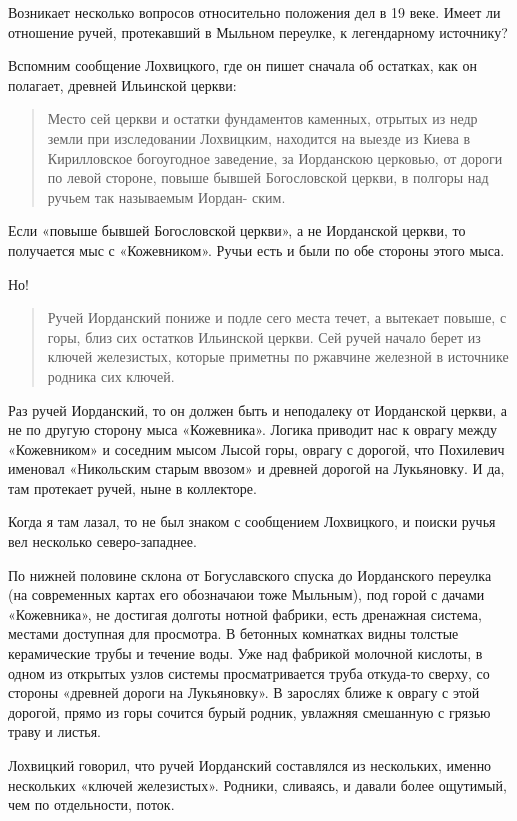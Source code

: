 Возникает несколько вопросов относительно положения дел в 19 веке. Имеет ли отношение ручей, протекавший в Мыльном переулке, к легендарному источнику?

Вспомним сообщение Лохвицкого, где он пишет сначала об остатках, как он полагает, древней Ильинской церкви: 

\begin{quotation}
Место сей церкви и остатки фундаментов
каменных, отрытых из недр земли при изследовании Лохвицким, находится на выезде из Киева в Кирилловское богоугодное заведение,
за Иорданскою церковью, от дороги по левой
стороне, повыше бывшей Богословской церкви,
в полгоры над ручьем так называемым Иордан-
ским.
\end{quotation}

Если «повыше бывшей Богословской церкви», а не Иорданской церкви, то получается мыс с «Кожевником». Ручьи есть и были по обе стороны этого мыса.

Но!

\begin{quotation}
Ручей Иорданский пониже и подле сего места течет, а вытекает повыше, с горы, близ сих остатков Ильинской церкви. Сей ручей начало берет из ключей железистых, которые приметны по ржавчине железной в источнике родника сих ключей.
\end{quotation}

Раз ручей Иорданский, то он должен быть и неподалеку от Иорданской церкви, а не по другую сторону мыса «Кожевника». Логика приводит нас к оврагу между «Кожевником» и соседним мысом Лысой горы, оврагу с дорогой, что Похилевич именовал «Никольским старым ввозом» и древней дорогой на Лукьяновку. И да, там протекает ручей, ныне в коллекторе.

Когда я там лазал, то не был знаком с сообщением Лохвицкого, и поиски ручья вел несколько северо-западнее.

По нижней половине склона от Богуславского спуска до Иорданского переулка (на современных картах его обозначаюи тоже Мыльным), под горой с дачами «Кожевника», не достигая долготы нотной фабрики, есть дренажная система, местами доступная для просмотра. В бетонных комнатках видны толстые керамические трубы и течение воды. Уже над фабрикой молочной кислоты, в одном из открытых узлов системы просматривается труба откуда-то сверху, со стороны «древней дороги на Лукьяновку». В зарослях ближе к оврагу с этой дорогой, прямо из горы сочится бурый родник, увлажняя смешанную с грязью траву и листья.

Лохвицкий говорил, что ручей Иорданский составлялся из нескольких, именно нескольких «ключей железистых». Родники, сливаясь, и давали более ощутимый, чем по отдельности, поток.

